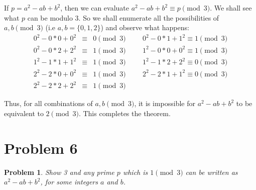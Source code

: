\documentclass[psamsfonts]{amsart}
\newtheorem{prob}{Problem}[section]
\newenvironment{sol}{{\bfseries Solution}}{\qedsymbol}
\theoremstyle{definition}
\theoremstyle{remark}
\numberwithin{equation}{section}
\begin{document}
\begin{sol}
If $p = a^2 - ab + b^2$, then we can evaluate $a^2 - ab + b^2 \equiv p \pmod{3}$. We shall see what $p$ can be modulo 3. So we shall enumerate all the possibilities of $a,b \pmod{3}$ (i.e $a,b = \{0,1,2\}$) and observe what happens:
\begin{eqnarray}
0^2 - 0*0 + 0^2 &\equiv& 0 \pmod{3} \hspace{1cm} 0^2 - 0*1 + 1^2 \equiv 1 \pmod{3} \\
0^2 - 0*2 + 2^2 &\equiv& 1 \pmod{3} \hspace{1cm} 1^2 - 0*0 + 0^2 \equiv 1 \pmod{3} \\
1^2 - 1*1 + 1^2 &\equiv& 1 \pmod{3} \hspace{1cm} 1^2 - 1*2 + 2^2 \equiv 0 \pmod{3} \\
2^2 - 2*0 + 0^2 &\equiv& 1 \pmod{3} \hspace{1cm} 2^2 - 2*1 + 1^2 \equiv 0 \pmod{3} \\
2^2 - 2*2 + 2^2 &\equiv& 1 \pmod{3}
\end{eqnarray}

Thus, for all combinations of $a,b \pmod{3}$, it is impossible for $a^2 - ab + b^2$ to be equivalent to $2 \pmod{3}$. This completes the theorem.
\end{sol}

\section{Problem 6}

\begin{prob}
Show 3 and any prime $p$ which is $1 \pmod{3}$ can be written as $a^2 - ab + b^2$, for some integers $a$ and $b$. 
\end{prob}
\end{document}
